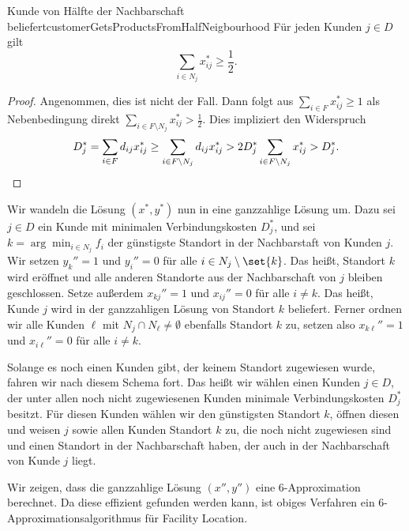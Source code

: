 \documentclass[language=ngerman,algolist]{TemplateLecture}
\begin{document}
\begin{lem}{Kunde von Hälfte der Nachbarschaft beliefert}{customerGetsProductsFromHalfNeigbourhood}
    Für jeden Kunden $j \in D$ gilt
    \begin{equation*}
        \sum_{i \in N_j} x_{ij}^* \geq \frac{1}{2}.
    \end{equation*}
\end{lem}
\begin{proof}
    Angenommen, dies ist nicht der Fall. Dann folgt aus $\sum_{i \in F} x_{ij}^* \geq 1$ als Nebenbedingung direkt $\sum_{i \in F \setminus N_j} x_{ij}^* > \frac{1}{2}$. Dies impliziert den Widerspruch 
    \begin{equation*}
        D_j^* = \sum_{i \in F} d_{ij} x_{ij}^* \geq \sum_{i \in F \setminus N_j} d_{ij} x_{ij}^* > 2D_j^* \sum_{i \in F \setminus N_j} x_{ij}^* > D_j^*. \qedhere
    \end{equation*}
\end{proof}

Wir wandeln die Lösung $(x^*, y^*)$ nun in eine ganzzahlige Lösung um. Dazu sei $j \in D$ ein Kunde mit minimalen Verbindungskosten $D_j^*$, und sei $k = \arg\min_{i \in N_j} f_i$ der günstigste Standort in der Nachbarstaft von Kunden $j$. Wir setzen $y_k'' = 1$ und $y_i'' = 0$ für alle $i \in N_j \setminus \set{k}$. Das heißt, Standort $k$ wird eröffnet und alle anderen Standorte aus der Nachbarschaft von $j$ bleiben geschlossen. Setze außerdem $x_{kj}'' = 1$ und $x_{ij}'' = 0$ für alle $i \neq k$. Das heißt, Kunde $j$ wird in der ganzzahligen Lösung von Standort $k$ beliefert. Ferner ordnen wir alle Kunden $\ell$ mit $N_j \cap N_\ell \neq \emptyset$ ebenfalls Standort $k$ zu, setzen also $x_{k\ell}'' = 1$ und $x_{i\ell}'' = 0$ für alle $i \neq k$.

Solange es noch einen Kunden gibt, der keinem Standort zugewiesen wurde, fahren wir nach diesem Schema fort. Das heißt wir wählen einen Kunden $j \in D$, der unter allen noch nicht zugewiesenen Kunden minimale Verbindungskosten $D_j^*$ besitzt. Für diesen Kunden wählen wir den günstigsten Standort $k$, öffnen diesen und weisen $j$ sowie allen Kunden Standort $k$ zu, die noch nicht zugewiesen sind und einen Standort in der Nachbarschaft haben, der auch in der Nachbarschaft von Kunde $j$ liegt.

Wir zeigen, dass die ganzzahlige Lösung $(x'', y'')$ eine $6$-Approximation berechnet. Da diese effizient gefunden werden kann, ist obiges Verfahren ein $6$-Approximationsalgorithmus für Facility Location.
\end{document}
